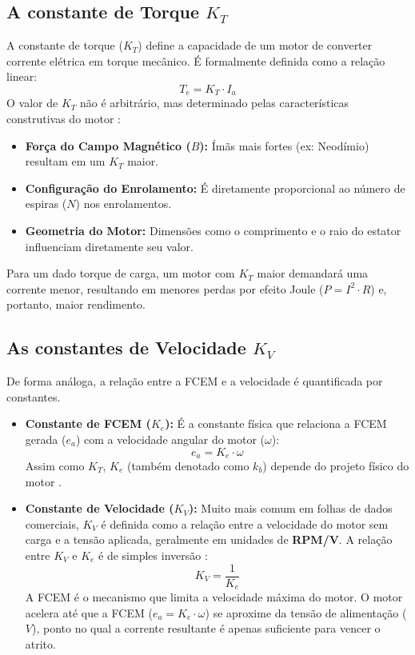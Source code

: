 \subsection{\texorpdfstring{A constante de Torque $K_T$}{A constante de Torque KT}}
\label{KT}
A constante de torque ($K_T$) define a capacidade de um motor de converter corrente elétrica em torque mecânico. É formalmente definida como a relação linear:
\begin{equation}
    T_e = K_T \cdot I_a
\end{equation}
O valor de $K_T$ não é arbitrário, mas determinado pelas características construtivas do motor \parencite{hendershot1994design}:
\begin{itemize}
    \item \textbf{Força do Campo Magnético ($B$):} Ímãs mais fortes (ex: Neodímio) resultam em um $K_T$ maior.
    \item \textbf{Configuração do Enrolamento:} É diretamente proporcional ao número de espiras ($N$) nos enrolamentos.
    \item \textbf{Geometria do Motor:} Dimensões como o comprimento e o raio do estator influenciam diretamente seu valor.
\end{itemize}
Para um dado torque de carga, um motor com $K_T$ maior demandará uma corrente menor, resultando em menores perdas por efeito Joule ($P = I^2 \cdot R$) e, portanto, maior rendimento.

\subsection{\texorpdfstring{As constantes de Velocidade $K_V$}{As constantes de Velocidade KV}}
\label{KV}

De forma análoga, a relação entre a FCEM e a velocidade é quantificada por constantes.
\begin{itemize}
    \item \textbf{Constante de FCEM ($K_e$):} É a constante física que relaciona a FCEM gerada ($e_a$) com a velocidade angular do motor ($\omega$):
    \begin{equation}
        e_a = K_e \cdot \omega
    \end{equation}
    Assim como $K_T$, $K_e$ (também denotado como $k_b$) depende do projeto físico do motor \parencite{zoltan2012understanding}.

    \item \textbf{Constante de Velocidade ($K_V$):} Muito mais comum em folhas de dados comerciais, $K_V$ é definida como a relação entre a velocidade do motor sem carga e a tensão aplicada, geralmente em unidades de \textbf{RPM/V}. A relação entre $K_V$ e $K_e$ é de simples inversão \parencite{infineon2011bldc}:
    \begin{equation}
        K_V = \frac{1}{K_e}
    \end{equation}
    A FCEM é o mecanismo que limita a velocidade máxima do motor. O motor acelera até que a FCEM ($e_a = K_e \cdot \omega$) se aproxime da tensão de alimentação ($V$), ponto no qual a corrente resultante é apenas suficiente para vencer o atrito.
\end{itemize}

